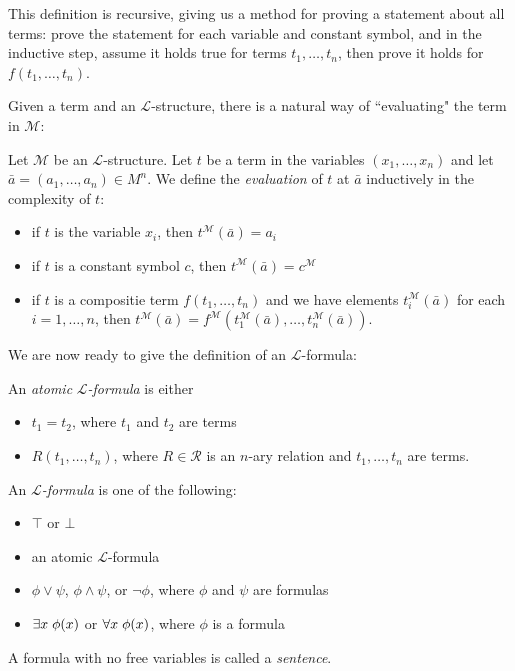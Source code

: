 This definition is recursive, giving us a method for proving a statement about all terms: prove the statement for each variable and constant symbol, and in the inductive step, assume it holds true for terms $t_1,\dots, t_n$, then prove it holds for $f(t_1,\dots, t_n)$.

Given a term and an $\mathcal{L}$-structure, there is a natural way of ``evaluating" the term in $\mathcal{M}$:

\begin{definition}
Let $\mathcal{M}$ be an $\mathcal{L}$-structure. Let $t$ be a term in the variables $(x_1,\dots, x_n)$ and let $\bar{a}=(a_1,\dots, a_n)\in M^n$. We define the \emph{evaluation} of $t$ at $\bar{a}$ inductively in the complexity of $t$:
\begin{itemize}
	\item if $t$ is the variable $x_i$, then $t^{\mathcal{M}}(\bar{a})=a_i$
	\item if $t$ is a constant symbol $c$, then $t^{\mathcal{M}}(\bar{a})=c^{\mathcal{M}}$
	\item if $t$ is a compositie term $f(t_1,\dots, t_n)$ and we have elements $t_i^{\mathcal{M}}(\bar{a})$ for each $i=1,\dots, n$, then $t^{\mathcal{M}}(\bar{a})=f^{\mathcal{M}}(t_1^{\mathcal{M}}(\bar{a}),\dots, t_n^{\mathcal{M}}(\bar{a}))$.
\end{itemize}
\end{definition}

We are now ready to give the definition of an $\mathcal{L}$-formula:

\begin{definition}
An \emph{atomic }$\mathcal{L}$\emph{-formula} is either
\begin{itemize}
	\item $t_1=t_2$, where $t_1$ and $t_2$ are terms
	\item $R(t_1,\dots, t_n)$, where $R\in\mathcal{R}$ is an $n$-ary relation and $t_1,\dots, t_n$ are terms.
\end{itemize}
An $\mathcal{L}$\emph{-formula} is one of the following:
\begin{itemize}
	\item $\top$ or $\bot$
	\item an atomic $\mathcal{L}$-formula
	\item $\phi\vee \psi$, $\phi\wedge \psi$, or $\neg\phi$, where $\phi$ and $\psi$ are formulas
	\item $\exists x \hspace{0.1cm}\phi(x)$ or $\forall x \hspace{0.1cm}\phi(x)$, where $\phi$ is a formula
\end{itemize}
A formula with no free variables is called a \emph{sentence}.
\end{definition}

